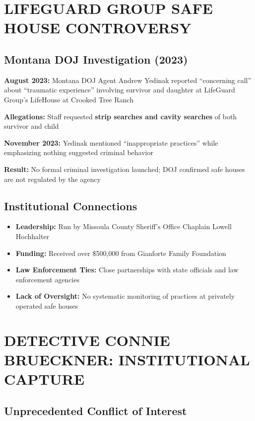 \documentclass[12pt,oneside]{article}
\begin{document}
\section*{LIFEGUARD GROUP SAFE HOUSE CONTROVERSY}

\subsection*{Montana DOJ Investigation (2023)}

\textbf{August 2023:} Montana DOJ Agent Andrew Yedinak reported ``concerning call'' about ``traumatic experience'' involving survivor and daughter at LifeGuard Group's LifeHouse at Crooked Tree Ranch

\textbf{Allegations:} Staff requested \textbf{strip searches and cavity searches} of both survivor and child

\textbf{November 2023:} Yedinak mentioned ``inappropriate practices'' while emphasizing nothing suggested criminal behavior

\textbf{Result:} No formal criminal investigation launched; DOJ confirmed safe houses are not regulated by the agency

\subsection*{Institutional Connections}

\begin{itemize}
\item \textbf{Leadership:} Run by Missoula County Sheriff's Office Chaplain Lowell Hochhalter
\item \textbf{Funding:} Received over \$500,000 from Gianforte Family Foundation
\item \textbf{Law Enforcement Ties:} Close partnerships with state officials and law enforcement agencies
\item \textbf{Lack of Oversight:} No systematic monitoring of practices at privately operated safe houses
\end{itemize}

\section*{DETECTIVE CONNIE BRUECKNER: INSTITUTIONAL CAPTURE}

\subsection*{Unprecedented Conflict of Interest}
\end{document}
